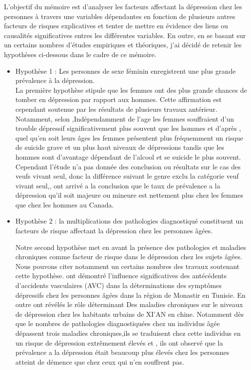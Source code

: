 \documentclass[a4paper]{article}
\begin{document}
		L'objectif du mémoire est d'analyser les facteurs affectant la dépression chez les personnes à travers une variables dépendantes en fonction de plusieurs autres facteurs de risques explicatives et tenter de mettre en évidence  des liens ou causalités significatives entres les différentes variables. En outre, en se basant sur un certains nombres d'études empiriques et théoriques, j’ai décidé de retenir  les hypothèses ci-dessous dans le cadre de ce mémoire.
		
		\begin{itemize}[label=\textbullet]
			\item Hypothèse 1 : Les personnes de sexe féminin enregistrent une plus grande prévalence à la dépression.\\
			La première hypothèse stipule que les femmes ont des plus grande chances de tomber en dépression par rapport aux hommes. Cette affirmation est cependant soutenue par les résultats de plusieurs travaux antérieur. Notamment, selon \citep{Yunming2012},Indépendamment de l'age les femmes souffraient d'un trouble dépressif significativement plus souvent que les hommes et d’après \citep{Cousteaux2008}, quel qu’en soit leurs âges  les femmes présentent plus fréquemment un risque de suicide grave et un plus haut niveaux de dépressions  tandis que les hommes sont d’avantage dépendant de l’alcool et se suicide le plus souvent. Cependant l’étude n’a pas donnée des conclusion ou résultats sur le cas des veufs vivant seul, donc la différence suivant le genre exclu la  catégorie veuf vivant seul,\citep{phac_chronic_diseases}, ont arrivé a la conclusion que le taux de prévalence a la dépression qu'il soit majeure ou mineure est nettement plus chez les femmes que chez les hommes au Canada.
			
			\item Hypothèse 2 : la multiplications des pathologies diagnostiqué constituent un facteurs de risque affectant la dépression chez les personnes âgées.
			
			Notre second hypothèse met en avant la présence des pathologies et maladies chroniques comme facteur de risque dans le dépression chez les sujets âgées. Nous pouvons citer notamment un certains nombres des travaux soutenant cette hypothèse. \cite{Hammami2012} ont démontré l’influence significatives des antécédents d’accidents vasculaires (AVC) dans la déterminations des symptômes dépressifs chez les personnes âgées dans la région de Monastir en Tunisie. En outre \cite{Yunming2012} ont révélés le rôle déterminant Des maladies chroniques sur le niveaux de dépression chez les habitants urbains de XI’AN en chine.  Notamment dès que le nombres de pathologies diagnostiquées chez un individus âgée dépassent trois maladies chroniques,ils se traduisent chez cette individus en un risque de dépression extrêmement élevés et \citep{phac_chronic_diseases}, ils ont observé que la prévalence a la dépression était beaucoup plus élevés chez les personnes atteint de démence que chez ceux qui n'en souffrent pas.
			

\end{itemize}
\end{document}
